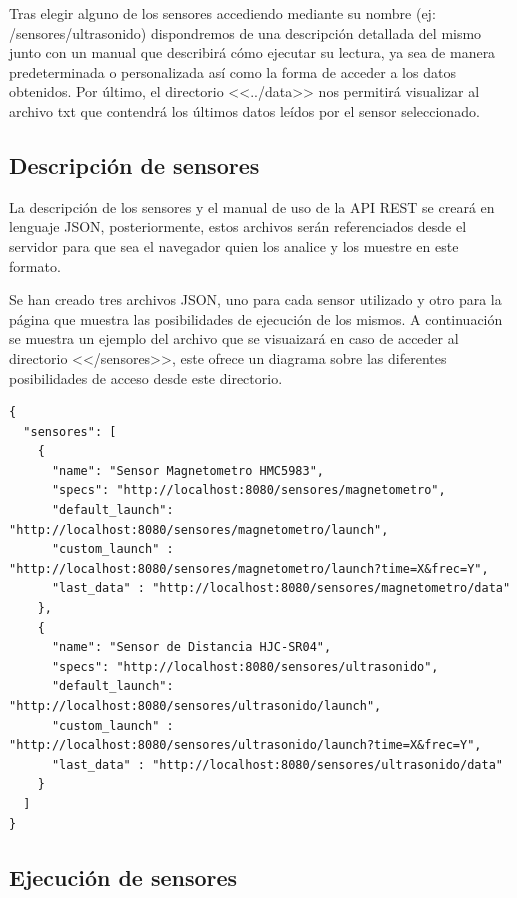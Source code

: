 Tras elegir alguno de los sensores accediendo mediante su nombre (ej: /sensores/ultrasonido) dispondremos de una descripción detallada del mismo junto con un manual que describirá cómo ejecutar su lectura, ya sea de manera predeterminada o personalizada así como la forma de acceder a los datos obtenidos. Por último, el directorio <<../data>> nos permitirá visualizar al archivo txt que contendrá los últimos datos leídos por el sensor seleccionado.


\subsection{Descripción de sensores}

La descripción de los sensores y el manual de uso de la API REST se creará en lenguaje JSON, posteriormente, estos archivos serán referenciados desde el servidor para que sea el navegador quien los analice y los muestre en este formato.

Se han creado tres archivos JSON, uno para cada sensor utilizado y otro para la página que muestra las posibilidades de ejecución de los mismos. A continuación se muestra un ejemplo del archivo que se visuaizará en caso de acceder al directorio <</sensores>>, este ofrece un diagrama sobre las diferentes posibilidades de acceso desde este directorio.
\clearpage
\lstset{language=JSON, breaklines=true, basicstyle=\footnotesize}
\begin{lstlisting}[frame=single, caption=sensores.json]
{
  "sensores": [
    {
      "name": "Sensor Magnetometro HMC5983",
      "specs": "http://localhost:8080/sensores/magnetometro",
      "default_launch": "http://localhost:8080/sensores/magnetometro/launch",
      "custom_launch" : "http://localhost:8080/sensores/magnetometro/launch?time=X&frec=Y",
      "last_data" : "http://localhost:8080/sensores/magnetometro/data"
    },
    {
      "name": "Sensor de Distancia HJC-SR04",
      "specs": "http://localhost:8080/sensores/ultrasonido",
      "default_launch": "http://localhost:8080/sensores/ultrasonido/launch",
      "custom_launch" : "http://localhost:8080/sensores/ultrasonido/launch?time=X&frec=Y",
      "last_data" : "http://localhost:8080/sensores/ultrasonido/data"
    }
  ]
}
\end{lstlisting}


\subsection{Ejecución de sensores}

